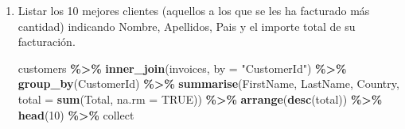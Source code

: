 \documentclass[
]{book}
\newenvironment{Shaded}{\begin{snugshade}}{\end{snugshade}}
\newcommand{\AttributeTok}[1]{\textcolor[rgb]{0.13,0.29,0.53}{#1}}
\newcommand{\ConstantTok}[1]{\textcolor[rgb]{0.56,0.35,0.01}{#1}}
\newcommand{\DecValTok}[1]{\textcolor[rgb]{0.00,0.00,0.81}{#1}}
\newcommand{\FunctionTok}[1]{\textcolor[rgb]{0.13,0.29,0.53}{\textbf{#1}}}
\newcommand{\NormalTok}[1]{#1}
\newcommand{\SpecialCharTok}[1]{\textcolor[rgb]{0.81,0.36,0.00}{\textbf{#1}}}
\newcommand{\StringTok}[1]{\textcolor[rgb]{0.31,0.60,0.02}{#1}}
\begin{document}
\begin{enumerate}
\begin{verbatim}
## # Source:   SQL [5 x 2]
## # Database: sqlite 3.46.0 [C:\Users\guill\GitHub\tgdbook\data\chinook.db]
##   MediaTypeId Name                       
##         <int> <chr>                      
## 1           1 MPEG audio file            
## 2           2 Protected AAC audio file   
## 3           3 Protected MPEG-4 video file
## 4           4 Purchased AAC audio file   
## 5           5 AAC audio file
\end{verbatim}

\begin{Shaded}
\begin{Highlighting}[]
\NormalTok{tracks }\SpecialCharTok{\%\textgreater{}\%} \FunctionTok{inner\_join}\NormalTok{(media\_types, }\AttributeTok{by =} \StringTok{"MediaTypeId"}\NormalTok{) }\SpecialCharTok{\%\textgreater{}\%} \FunctionTok{count}\NormalTok{(Name.y) }\SpecialCharTok{\%\textgreater{}\%} 
\NormalTok{    collect }\SpecialCharTok{\%\textgreater{}\%} \FunctionTok{mutate}\NormalTok{(}\AttributeTok{freq =}\NormalTok{ n }\SpecialCharTok{/} \FunctionTok{sum}\NormalTok{(n)) }\SpecialCharTok{\%\textgreater{}\%} \FunctionTok{filter}\NormalTok{(}\FunctionTok{grepl}\NormalTok{(}\StringTok{\textquotesingle{}video\textquotesingle{}}\NormalTok{, Name.y))}
\end{Highlighting}
\end{Shaded}

\begin{verbatim}
## # A tibble: 1 x 3
##   Name.y                          n   freq
##   <chr>                       <int>  <dbl>
## 1 Protected MPEG-4 video file   214 0.0611
\end{verbatim}
\item
  Listar los 10 mejores clientes (aquellos a los que se les ha facturado más cantidad)
  indicando Nombre, Apellidos, Pais y el importe total de su facturación.

\begin{Shaded}
\begin{Highlighting}[]
\NormalTok{customers }\SpecialCharTok{\%\textgreater{}\%} \FunctionTok{inner\_join}\NormalTok{(invoices, }\AttributeTok{by =} \StringTok{"CustomerId"}\NormalTok{) }\SpecialCharTok{\%\textgreater{}\%} \FunctionTok{group\_by}\NormalTok{(CustomerId) }\SpecialCharTok{\%\textgreater{}\%} 
    \FunctionTok{summarise}\NormalTok{(FirstName, LastName, Country, }\AttributeTok{total =} \FunctionTok{sum}\NormalTok{(Total, }\AttributeTok{na.rm =} \ConstantTok{TRUE}\NormalTok{)) }\SpecialCharTok{\%\textgreater{}\%}  
    \FunctionTok{arrange}\NormalTok{(}\FunctionTok{desc}\NormalTok{(total)) }\SpecialCharTok{\%\textgreater{}\%} \FunctionTok{head}\NormalTok{(}\DecValTok{10}\NormalTok{) }\SpecialCharTok{\%\textgreater{}\%}\NormalTok{ collect}
\end{Highlighting}
\end{Shaded}


\end{enumerate}
\end{document}
